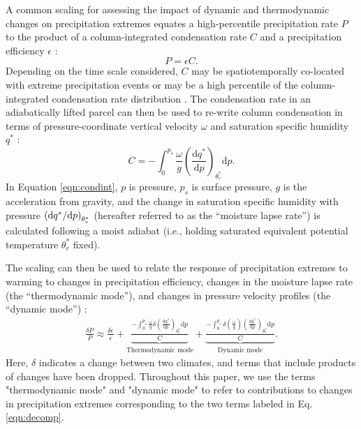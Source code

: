 \documentclass[twocol]{ametsoc}
\begin{document}
A common scaling for assessing the impact of dynamic and thermodynamic changes on precipitation extremes equates a high-percentile precipitation rate $P$ to the product of a column-integrated condensation rate $C$ and a precipitation efficiency $\epsilon$ \citep{OGorman2009TheChange,Muller2011IntensificationModel}:
\begin{equation}
    P = \epsilon C.
\end{equation}
Depending on the time scale considered, $C$ may be spatiotemporally co-located with extreme precipitation events \citep[as in][]{Muller2011IntensificationModel,Fildier2017SimultaneousChange} or may be a high percentile of the column-integrated condensation rate distribution \citep[as in][]{Singh2014TheTemperature}. The condensation rate in an adiabatically lifted parcel can then be used to re-write column condensation in terms of pressure-coordinate vertical velocity $\omega$ and saturation specific humidity $q^*$ \citep{OGorman2009TheChange}:
\begin{equation} \label{eqn:condint}
    C = -\int_{0}^{p_s} \frac{\omega}{g} \left(\frac{\mathrm{d}q^*}{\mathrm{d}p} \right)_{\theta_e^*} \mathrm{d}{p}.
\end{equation}
In Equation \ref{eqn:condint}, $p$ is pressure, $p_s$ is surface pressure, $g$ is the acceleration from gravity, and the change in saturation specific humidity with pressure $\left({\rm d}q^*/{\rm d}p\right)_{\theta_e^*}$ (hereafter referred to as the ``moisture lapse rate'') is calculated following a moist adiabat (i.e., holding saturated equivalent potential temperature $\theta_e^*$ fixed). 

The scaling can then be used to relate the response of precipitation extremes to warming to changes in precipitation efficiency, changes in the moisture lapse rate (the ``thermodynamic mode''), and changes in pressure velocity profiles (the ``dynamic mode'') \citep{Muller2011IntensificationModel}:
\begin{equation}
\begin{split}
    \frac{\delta P}{P} \approx \frac{\delta \epsilon}{\epsilon} + \underbrace{\frac{-\int_{0}^{p_s} \frac{\omega}{g} \delta \left(\frac{\mathrm{d}q^*}{\mathrm{d}p} \right)_{\theta_e^*} \mathrm{d}{p}}{C}}_\text{Thermodynamic mode} + \underbrace{\frac{-\int_{0}^{p_s} \delta \left ( \frac{\omega}{g} \right) \left(\frac{\mathrm{d}q^*}{\mathrm{d}p} \right)_{\theta_e^*} \mathrm{d}{p}}{C}}_\text{Dynamic mode}.
\label{eqn:decomp}
\end{split}
\end{equation}
Here, $\delta$ indicates a change between two climates, and terms that include products of changes have been dropped. Throughout this paper, we use the terms "thermodynamic mode" and "dynamic mode" to refer to contributions to changes in precipitation extremes corresponding to the two terms labeled in Eq. \ref{eqn:decomp}.
\end{document}
